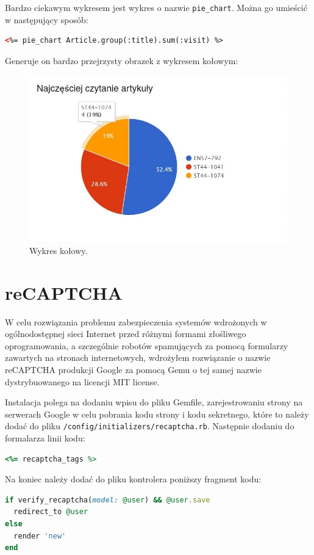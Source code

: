 \documentclass[openright]{xmgr}
\begin{document}
Bardzo ciekawym wykresem jest wykres o nazwie \texttt{pie\_chart}. Można go umieścić w następujący sposób:
\begin{lstlisting}[language=html, caption={Kod uruchamiający wykres kołowy}]
<%= pie_chart Article.group(:title).sum(:visit) %>
\end{lstlisting}
Generuje on bardzo przejrzysty obrazek z wykresem kołowym:
\begin{figure}[!tbh]
\centering
\includegraphics[width=.5\linewidth]{fig/chartkick}
\caption{Wykres kołowy.}
\end{figure}

\section{reCAPTCHA}

W celu rozwiązania problemu zabezpieczenia systemów wdrożonych w ogólnodostępnej sieci Internet przed różnymi formami złośliwego oprogramowania, a szczególnie robotów spamujących za pomocą formularzy zawartych na stronach internetowych, wdrożyłem rozwiązanie o nazwie reCAPTCHA produkcji Google za pomocą Gemu o tej samej nazwie \cite{recaptcha} dystrybuowanego na licencji MIT license. 

\newpage

Instalacja polega na dodaniu wpisu do pliku Gemfile, zarejestrowaniu strony na serwerach Google w celu pobrania kodu strony i kodu sekretnego, które to należy dodać do pliku \texttt{/config/initializers/recaptcha.rb}. Następnie dodaniu do formalarza linii kodu:
\begin{lstlisting}[language=ruby, caption={Kod wyświetlający formularz reCAPTCHA}]
<%= recaptcha_tags %> 
\end{lstlisting}
Na koniec należy dodać do pliku kontrolera poniższy fragment kodu: 
\begin{lstlisting}[language=ruby, caption={Kod kontrolera weryfikujący reCAPTCHA}]
if verify_recaptcha(model: @user) && @user.save
  redirect_to @user
else
  render 'new'
end
\end{lstlisting}
\end{document}
